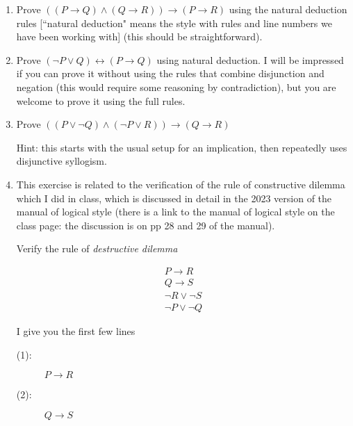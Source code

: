 \documentclass[12pt]{article}
\begin{document}
\begin{enumerate}

\item  Prove $((P \rightarrow Q) \wedge (Q \rightarrow R)) \rightarrow (P \rightarrow R)$ using the natural deduction rules [``natural deduction" means the style with rules and line numbers we have been working with] (this should be straightforward).

\item Prove $(\neg P \vee Q) \leftrightarrow (P \rightarrow Q)$ using natural deduction.  I will be impressed if you can prove it without using the rules that combine disjunction and negation (this would require some reasoning by contradiction), but you are welcome to prove it using the full rules.

\item Prove $((P \vee \neg Q) \wedge (\neg P \vee R)) \rightarrow (Q \rightarrow R)$

Hint:  this starts with the usual setup for an implication, then repeatedly uses disjunctive syllogism.



\item  This exercise is related to the verification of the rule of constructive dilemma which I did in class, which is discussed in detail in the 2023 version of the manual of logical style (there is a link to the manual of logical style  on the class page:  the discussion is on pp 28 and 29 of the manual).

Verify the rule of {\em destructive dilemma\/}

$$\begin{array}{c}

P \rightarrow R\\

Q \rightarrow S \\

\neg R \vee \neg S \\ \hline

\neg P \vee \neg Q

\end{array}$$

I give you the first few lines

\begin{description}

\item[(1):]  $P \rightarrow R$

\item[(2):]  $Q \rightarrow S$


\end{description}
\end{enumerate}
\end{document}
